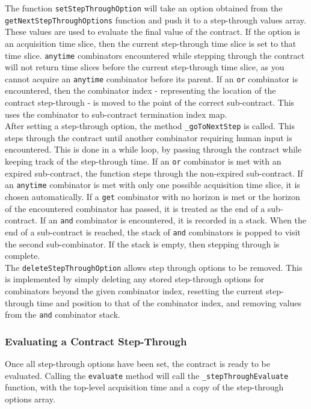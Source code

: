 The function \texttt{setStepThroughOption} will take an option obtained from the \texttt{getNextStepThrough\-Options} function and push it to a step-through values array. These values are used to evaluate the final value of the contract. If the option is an acquisition time slice, then the current step-through time slice is set to that time slice. \texttt{anytime} combinators encountered while stepping through the contract will not return time slices before the current step-through time slice, as you cannot acquire an \texttt{anytime} combinator before its parent. If an \texttt{or} combinator is encountered, then the combinator index - representing the location of the contract step-through - is moved to the point of the correct sub-contract. This uses the combinator to sub-contract termination index map. \\

After setting a step-through option, the method \texttt{\_goToNextStep} is called. This steps through the contract until another combinator requiring human input is encountered. This is done in a while loop, by passing through the contract while keeping track of the step-through time. If an \texttt{or} combinator is met with an expired sub-contract, the function steps through the non-expired sub-contract. If an \texttt{anytime} combinator is met with only one possible acquisition time slice, it is chosen automatically. If a \texttt{get} combinator with no horizon is met or the horizon of the encountered combinator has passed, it is treated as the end of a sub-contract. If an \texttt{and} combinator is encountered, it is recorded in a stack. When the end of a sub-contract is reached, the stack of \texttt{and} combinators is popped to visit the second sub-combinator. If the stack is empty, then stepping through is complete. \\

The \texttt{deleteStepThroughOption} allows step through options to be removed. This is implemented by simply deleting any stored step-through options for combinators beyond the given combinator index, resetting the current step-through time and position to that of the combinator index, and removing values from the \texttt{and} combinator stack.


\subsubsection{Evaluating a Contract Step-Through}

Once all step-through options have been set, the contract is ready to be evaluated. Calling the \texttt{evaluate} method will call the \texttt{\_stepThroughEvaluate} function, with the top-level acquisition time and a copy of the step-through options array. \\

